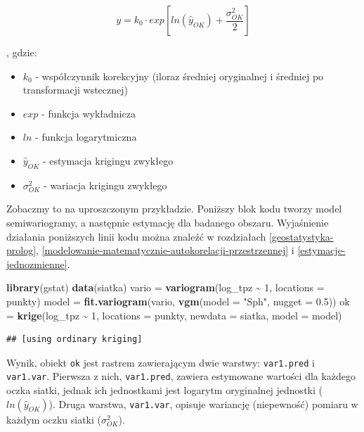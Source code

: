 \documentclass[
  paper=6in:9in,pagesize=pdftex,headinclude=on,footinclude=on,10pt]{scrbook}
\newenvironment{Shaded}{\begin{snugshade}}{\end{snugshade}}
\newcommand{\AttributeTok}[1]{\textcolor[rgb]{0.13,0.29,0.53}{#1}}
\newcommand{\DecValTok}[1]{\textcolor[rgb]{0.00,0.00,0.81}{#1}}
\newcommand{\FloatTok}[1]{\textcolor[rgb]{0.00,0.00,0.81}{#1}}
\newcommand{\FunctionTok}[1]{\textcolor[rgb]{0.13,0.29,0.53}{\textbf{#1}}}
\newcommand{\NormalTok}[1]{#1}
\newcommand{\OtherTok}[1]{\textcolor[rgb]{0.56,0.35,0.01}{#1}}
\newcommand{\SpecialCharTok}[1]{\textcolor[rgb]{0.81,0.36,0.00}{\textbf{#1}}}
\newcommand{\StringTok}[1]{\textcolor[rgb]{0.31,0.60,0.02}{#1}}
\providecommand{\tightlist}{%
  \setlength{\itemsep}{0pt}\setlength{\parskip}{0pt}}
\begin{document}
\[y = k_0 \cdot exp[ln(\hat{y}_{OK})+\frac{\sigma^2_{OK}}{2}]\]

, gdzie:

\begin{itemize}
\tightlist
\item
  \(k_0\) - współczynnik korekcyjny (iloraz średniej oryginalnej i średniej po transformacji wstecznej)
\item
  \(exp\) - funkcja wykładnicza
\item
  \(ln\) - funkcja logarytmiczna
\item
  \(\hat{y}_{OK}\) - estymacja krigingu zwykłego
\item
  \(\sigma^2_{OK}\) - wariacja krigingu zwykłego
\end{itemize}

Zobaczmy to na uproszczonym przykładzie.
Poniższy blok kodu tworzy model semiwariogramy, a następnie estymację dla badanego obszaru.
Wyjaśnienie działania poniższych linii kodu można znaleźć w rozdziałach \ref{geostatystyka-prolog}, \ref{modelowanie-matematycznie-autokorelacji-przestrzennej} i \ref{estymacje-jednozmienne}.

\begin{Shaded}
\begin{Highlighting}[]
\FunctionTok{library}\NormalTok{(gstat)}
\FunctionTok{data}\NormalTok{(siatka)}
\NormalTok{vario }\OtherTok{=} \FunctionTok{variogram}\NormalTok{(log\_tpz }\SpecialCharTok{\textasciitilde{}} \DecValTok{1}\NormalTok{, }\AttributeTok{locations =}\NormalTok{ punkty)}
\NormalTok{model }\OtherTok{=} \FunctionTok{fit.variogram}\NormalTok{(vario, }\FunctionTok{vgm}\NormalTok{(}\AttributeTok{model =} \StringTok{"Sph"}\NormalTok{, }\AttributeTok{nugget =} \FloatTok{0.5}\NormalTok{))}
\NormalTok{ok }\OtherTok{=} \FunctionTok{krige}\NormalTok{(log\_tpz }\SpecialCharTok{\textasciitilde{}} \DecValTok{1}\NormalTok{,}
            \AttributeTok{locations =}\NormalTok{ punkty,}
            \AttributeTok{newdata =}\NormalTok{ siatka, }
            \AttributeTok{model =}\NormalTok{ model)}
\end{Highlighting}
\end{Shaded}

\begin{verbatim}
## [using ordinary kriging]
\end{verbatim}

Wynik, obiekt \texttt{ok} jest rastrem zawierającym dwie warstwy: \texttt{var1.pred} i \texttt{var1.var}.
Pierwsza z nich, \texttt{var1.pred}, zawiera estymowane wartości dla każdego oczka siatki, jednak ich jednostkami jest logarytm oryginalnej jednostki (\(ln(\hat{y}_{OK})\)).
Druga warstwa, \texttt{var1.var}, opisuje wariancję (niepewność) pomiaru w każdym oczku siatki (\(\sigma^2_{OK}\)).
\end{document}
